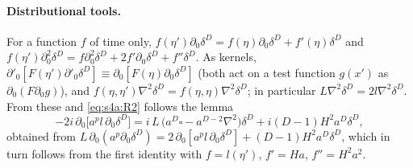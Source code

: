 \documentclass[aps,prd,onecolumn,10pt,nofootinbib,floatfix]{revtex4-2}
\begin{document}
\paragraph*{Distributional tools.}
For a function $f$ of time only,
$f(\eta')\partial_0\delta^D=f(\eta)\partial_0\delta^D+f'(\eta)\delta^D$ and
$f(\eta')\partial_0^2\delta^D=f\partial_0^2\delta^D+2f'\partial_0\delta^D+f''\delta^D$. As kernels,
$\partial'_0[F(\eta')\partial'_0\delta^D]\equiv\partial_0[F(\eta)\partial_0\delta^D]$ (both act on a test function
$g(x')$ as $\partial_0(F\partial_0g)$), and $f(\eta,\eta')\nabla^2\delta^D=f(\eta,\eta)\nabla^2\delta^D$; in
particular $L\nabla^2\delta^D=2l\nabla^2\delta^D$. From these and \eqref{eq:s4a:R2} follows the lemma
\begin{equation}
-2i\,\partial_0\big[a^pl\,\partial_0\delta^D\big]=i\,L\,\big(a^D\square-a^{D-2}\nabla^2\big)\delta^D+i(D-1)H^2a^D\delta^D ,
\label{eq:s4a:lemma}
\end{equation}
obtained from $L\,\partial_0(a^p\partial_0\delta^D)=2\,\partial_0[a^pl\,\partial_0\delta^D]+(D-1)H^2a^D\delta^D$, which in turn follows
from the first identity with $f=l(\eta')$, $f'=Ha$, $f''=H^2a^2$.
\end{document}

